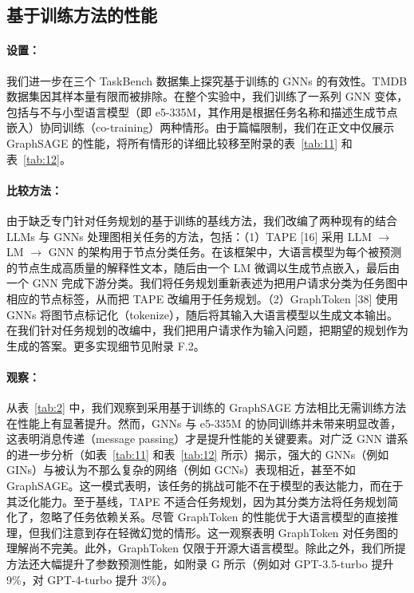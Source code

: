 \documentclass[11pt,UTF8,fontset=fandol]{ctexart}
\begin{document}
\subsection{基于训练方法的性能}

\paragraph{设置：}我们进一步在三个 TaskBench 数据集上探究基于训练的 GNNs 的有效性。TMDB 数据集因其样本量有限而被排除。在整个实验中，我们训练了一系列 GNN 变体，包括与不与小型语言模型（即 e5-335M，其作用是根据任务名称和描述生成节点嵌入）协同训练（co-training）两种情形。由于篇幅限制，我们在正文中仅展示 GraphSAGE 的性能，将所有情形的详细比较移至附录的表~\ref{tab:11} 和表~\ref{tab:12}。

\paragraph{比较方法：}由于缺乏专门针对任务规划的基于训练的基线方法，我们改编了两种现有的结合 LLMs 与 GNNs 处理图相关任务的方法，包括：（1）TAPE [16] 采用 LLM $\to$ LM $\to$ GNN 的架构用于节点分类任务。在该框架中，大语言模型为每个被预测的节点生成高质量的解释性文本，随后由一个 LM 微调以生成节点嵌入，最后由一个 GNN 完成下游分类。我们将任务规划重新表述为把用户请求分类为任务图中相应的节点标签，从而把 TAPE 改编用于任务规划。（2）GraphToken [38] 使用 GNNs 将图节点标记化（tokenize），随后将其输入大语言模型以生成文本输出。在我们针对任务规划的改编中，我们把用户请求作为输入问题，把期望的规划作为生成的答案。更多实现细节见附录 F.2。

\paragraph{观察：}从表~\ref{tab:2} 中，我们观察到采用基于训练的 GraphSAGE 方法相比无需训练方法在性能上有显著提升。然而，GNNs 与 e5-335M 的协同训练并未带来明显改善，这表明消息传递（message passing）才是提升性能的关键要素。对广泛 GNN 谱系的进一步分析（如表~\ref{tab:11} 和表~\ref{tab:12} 所示）揭示，强大的 GNNs（例如 GINs）与被认为不那么复杂的网络（例如 GCNs）表现相近，甚至不如 GraphSAGE。这一模式表明，该任务的挑战可能不在于模型的表达能力，而在于其泛化能力。至于基线，TAPE 不适合任务规划，因为其分类方法将任务规划简化了，忽略了任务依赖关系。尽管 GraphToken 的性能优于大语言模型的直接推理，但我们注意到存在轻微幻觉的情形。这一观察表明 GraphToken 对任务图的理解尚不完美。此外，GraphToken 仅限于开源大语言模型。除此之外，我们所提方法还大幅提升了参数预测性能，如附录 G 所示（例如对 GPT-3.5-turbo 提升 9\%，对 GPT-4-turbo 提升 3\%）。
\end{document}

